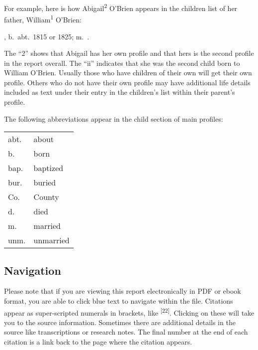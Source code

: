 For example, here is how Abigail\textsuperscript{2} O'Brien appears in the children list of her father, William\textsuperscript{1} O'Brien:

\vspace{\baselineskip}
	\begin{Kids}
	, b.\ abt.\ 1815 or 1825; m.\ .
	\end{Kids}
\vspace{\baselineskip}

The ``2'' shows that Abigail has her own profile and that hers is the second profile in the report overall. The ``ii'' indicates that she was the second child born to William O'Brien. Usually those who have children of their own will get their own profile. Others who do not have their own profile may have additional life details included as text under their entry in the children's list within their parent's profile.

The following abbreviations appear in the child section of main profiles:

\begin{center}
	\begin{tabular}{ll}
		abt. & about \\
		b. & born \\
		bap. & baptized \\
		bur. & buried \\
		Co. & County \\
		d. & died \\
		m. & married \\
		unm. & unmarried \\
	\end{tabular}
\end{center}

\subsection{Navigation}

Please note that if you are viewing this report electronically in PDF or ebook format, you are able to click blue text to navigate within the file. Citations appear as super-scripted numerals in brackets, like \textsuperscript{[22]}. Clicking on these will take you to the source information. Sometimes there are additional details in the source like transcriptions or research notes. The final number at the end of each citation is a link back to the page where the citation appears.


